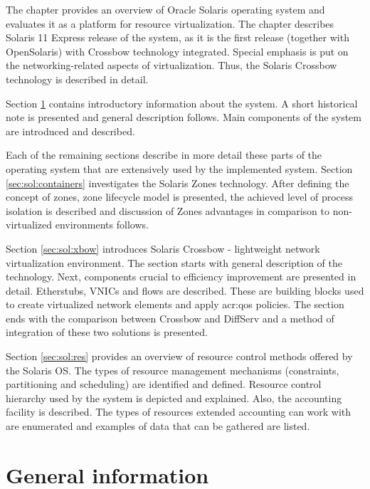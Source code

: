 \documentclass[11pt]{book}
\begin{document}

    The chapter provides an overview of Oracle Solaris operating system and evaluates it as a platform for resource
    virtualization. The chapter describes Solaris 11 Express release of the system, as it is the first release (together
    with OpenSolaris) with Crossbow technology integrated. Special emphasis is put on the networking-related aspects of
    virtualization. Thus, the Solaris Crossbow technology is described in detail.

    Section \ref{sec:sol:general} contains introductory information about the system. A short historical note is
    presented and general description follows. Main components of the system are introduced and described.
    
    Each of the remaining sections describe in more detail these parts of the operating system that are extensively used
    by the implemented system. Section \ref{sec:sol:containers} investigates the Solaris Zones technology. After
    defining the concept of zones, zone lifecycle model is presented, the achieved level of process isolation is
    described and discussion of Zones advantages in comparison to non-virtualized environments follows.

    Section \ref{sec:sol:xbow} introduces Solaris Crossbow - lightweight network virtualization environment. The section
    starts with general description of the technology. Next, components crucial to efficiency improvement are presented
    in detail. Etherstubs, VNICs and flows are described. These are building blocks used to create virtualized network
    elements and apply \gls{acr:qos} policies. The section ends with the comparison between Crossbow and DiffServ and a
    method of integration of these two solutions is presented.

    Section \ref{sec:sol:res} provides an overview of resource control methods offered by the Solaris OS. The types of
    resource management mechanisms (constraints, partitioning and scheduling) are identified and defined. Resource
    control hierarchy used by the system is depicted and explained. Also, the accounting facility is described. The
    types of resources extended accounting can work with are enumerated and examples of data that can be gathered are
    listed.


    \section{General information}
    \label{sec:sol:general}
\end{document}
